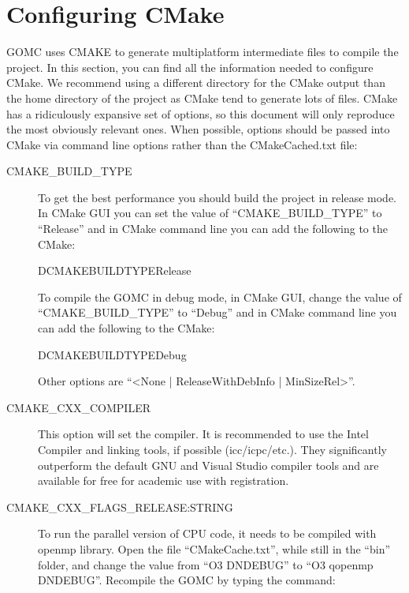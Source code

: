 \documentclass[letterpaper,10pt,english]{sphinxmanual}
\begin{document}
\section{Configuring CMake}
\label{\detokenize{compiling:configuring-cmake}}
GOMC uses CMAKE to generate multi\sphinxhyphen{}platform intermediate files to compile the project. In this section, you can find all the information needed to configure CMake.
We recommend using a different directory for the CMake output than the home directory of the project as CMake tend to generate lots of files.
CMake has a ridiculously expansive set of options, so this document will only reproduce the most obviously relevant ones. When possible, options should be passed into CMake via command line options rather than the CMakeCached.txt file:
\begin{description}
\item[{CMAKE\_BUILD\_TYPE}] \leavevmode
To get the best performance you should build the project in release mode. In CMake GUI you can set the value of “CMAKE\_BUILD\_TYPE” to “Release” and in CMake command line you can add the following to the CMake:

\begin{sphinxVerbatim}[commandchars=\\\{\}]
\PYGZhy{}DCMAKE\PYGZus{}BUILD\PYGZus{}TYPERelease
\end{sphinxVerbatim}

To compile the GOMC in debug mode, in CMake GUI, change the value of “CMAKE\_BUILD\_TYPE” to “Debug” and in CMake command line you can add the following to the CMake:

\begin{sphinxVerbatim}[commandchars=\\\{\}]
\PYGZhy{}DCMAKE\PYGZus{}BUILD\PYGZus{}TYPEDebug
\end{sphinxVerbatim}

Other options are “\textless{}None | ReleaseWithDebInfo | MinSizeRel\textgreater{}”.

\item[{CMAKE\_CXX\_COMPILER}] \leavevmode
This option will set the compiler. It is recommended to use the Intel Compiler and linking tools, if possible (icc/icpc/etc.). They significantly outperform the default GNU and Visual Studio compiler tools and are available for free for academic use with registration.

\item[{CMAKE\_CXX\_FLAGS\_RELEASE:STRING}] \leavevmode
To run the parallel version of CPU code, it needs to be compiled with openmp library. Open the file “CMakeCache.txt”, while still in the “bin” folder, and change the value from “\sphinxhyphen{}O3 \sphinxhyphen{}DNDEBUG” to “\sphinxhyphen{}O3 \sphinxhyphen{}qopenmp \sphinxhyphen{}DNDEBUG”. Recompile the GOMC by typing the command:


\end{description}
\end{document}
